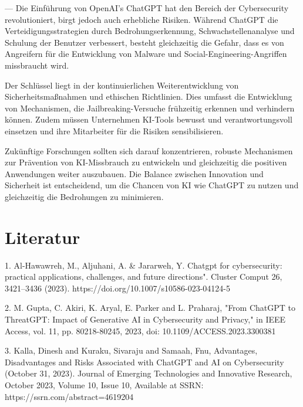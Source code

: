 \documentclass[a4paper,10pt,parskip,twocolumn]{article}
\begin{document}
---
Die Einführung von OpenAI's ChatGPT hat den Bereich der Cybersecurity revolutioniert, birgt jedoch auch erhebliche Risiken. Während ChatGPT die Verteidigungsstrategien durch Bedrohungserkennung, Schwachstellenanalyse und Schulung der Benutzer verbessert, besteht gleichzeitig die Gefahr, dass es von Angreifern für die Entwicklung von Malware und Social-Engineering-Angriffen missbraucht wird.

Der Schlüssel liegt in der kontinuierlichen Weiterentwicklung von Sicherheitsmaßnahmen und ethischen Richtlinien. Dies umfasst die Entwicklung von Mechanismen, die Jailbreaking-Versuche frühzeitig erkennen und verhindern können. Zudem müssen Unternehmen KI-Tools bewusst und verantwortungsvoll einsetzen und ihre Mitarbeiter für die Risiken sensibilisieren.

Zukünftige Forschungen sollten sich darauf konzentrieren, robuste Mechanismen zur Prävention von KI-Missbrauch zu entwickeln und gleichzeitig die positiven Anwendungen weiter auszubauen. Die Balance zwischen Innovation und Sicherheit ist entscheidend, um die Chancen von KI wie ChatGPT zu nutzen und gleichzeitig die Bedrohungen zu minimieren.
%

%
\printbibliography

\section{Literatur}

1. Al-Hawawreh, M., Aljuhani, A. \& Jararweh, Y. Chatgpt for cybersecurity: practical applications, challenges, and future directions". Cluster Comput 26, 3421–3436 (2023). https://doi.org/10.1007/s10586-023-04124-5


2. M. Gupta, C. Akiri, K. Aryal, E. Parker and L. Praharaj, "From ChatGPT to ThreatGPT: Impact of Generative AI in Cybersecurity and Privacy," in IEEE Access, vol. 11, pp. 80218-80245, 2023, doi: 10.1109/ACCESS.2023.3300381


3. Kalla, Dinesh and Kuraku, Sivaraju and Samaah, Fnu, Advantages, Disadvantages and Risks Associated with ChatGPT and AI on Cybersecurity (October 31, 2023). Journal of Emerging Technologies and Innovative Research, October 2023, Volume 10, Issue 10, Available at SSRN: https://ssrn.com/abstract=4619204
\end{document}
